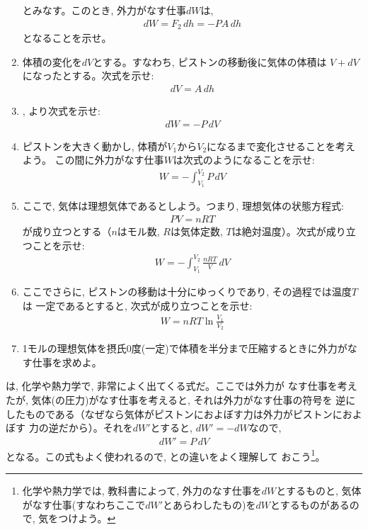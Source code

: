 \begin{q}
\begin{enumerate}
とみなす。このとき, 外力がなす仕事$dW$は, 
\begin{eqnarray}dW=F_2\,dh=-PA\,dh\label{eq:gas_work3}\end{eqnarray}
となることを示せ。
\item 体積の変化を$dV$とする。すなわち, ピストンの移動後に気体の体積は
$V+dV$になったとする。次式を示せ:
\begin{eqnarray}dV=A\,dh\label{eq:gas_work4}\end{eqnarray}
\item {}, より次式を示せ:
\begin{eqnarray}dW=-P\,dV\label{eq:gas_work5}\end{eqnarray}
\item ピストンを大きく動かし, 体積が$V_1$から$V_2$になるまで変化させることを考えよう。
この間に外力がなす仕事$W$は次式のようになることを示せ:
\begin{eqnarray}
W=-\int_{V_1}^{V_2}P\,dV
\end{eqnarray}
\item ここで, 気体は理想気体であるとしよう。つまり, 理想気体の状態方程式:
\begin{eqnarray}PV=nRT\end{eqnarray}
が成り立つとする（$n$はモル数, $R$は気体定数, $T$は絶対温度）。次式が成り立つことを示せ:
\begin{eqnarray}
W=-\int_{V_1}^{V_2}\frac{nRT}{V}\,dV
\end{eqnarray}
\item ここでさらに, ピストンの移動は十分にゆっくりであり, その過程では温度$T$は
一定であるとすると, 次式が成り立つことを示せ:
\begin{eqnarray}
W=nRT\ln\frac{V_1}{V_2}
\end{eqnarray}
\item 1モルの理想気体を摂氏0度(一定)で体積を半分まで圧縮するときに外力がなす仕事を求めよ。
\end{enumerate}
\end{q}
\vspace{0.2cm}

は, 化学や熱力学で, 非常によく出てくる式だ。ここでは外力が
なす仕事を考えたが, 気体(の圧力)がなす仕事を考えると, それは外力がなす仕事の符号を
逆にしたものである（なぜなら気体がピストンにおよぼす力は外力がピストンにおよぼす
力の逆だから）。それを$dW'$とすると, $dW'=-dW$なので, 
\begin{eqnarray}
dW'=P\,dV
\end{eqnarray}
となる。この式もよく使われるので, との違いをよく理解して
おこう\footnote{化学や熱力学では, 教科書によって, 外力のなす仕事を$dW$とするものと, 
気体がなす仕事(すなわちここで$dW'$とあらわしたもの)を$dW$とするものがあるので, 
気をつけよう。}。
\hv


